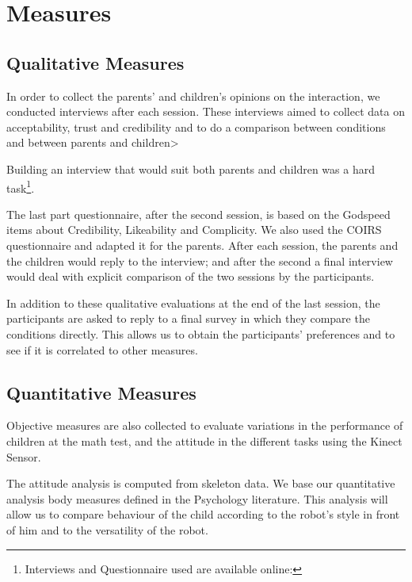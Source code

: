 \section{Measures}
\label{sec:measures}
\subsection{Qualitative Measures}
In order to collect the parents' and children's opinions on the interaction, we conducted interviews after each session.
These interviews aimed to collect data on acceptability, trust and credibility and to do a comparison between conditions and between parents and children>

Building an interview that would suit both parents and children was a hard task\footnote{Interviews and Questionnaire used are available online: }.%



The last part questionnaire, after the second session, is based on the Godspeed\cite{Bartneck2008b} items about Credibility, Likeability and Complicity.
We also used the COIRS~\cite{Robert2014} questionnaire and adapted it for the parents.
After each session, the parents and the children would reply to the interview; and after the second a final interview would deal with explicit comparison of the two sessions by the participants.


In addition to these qualitative evaluations at the end of the last session, the participants are asked to reply to a final survey in which they compare the conditions directly.
This allows us to obtain the participants' preferences and to see if it is correlated to other measures.

\subsection{Quantitative Measures}
Objective measures are also collected to evaluate variations in the performance of children at the math test, and the attitude in the different tasks using the Kinect Sensor.

The attitude analysis is computed from skeleton data.
We base our quantitative analysis body measures defined in the Psychology literature.
This analysis will allow us to compare behaviour of the child according to the robot's style in front of him and to the versatility of the robot.

